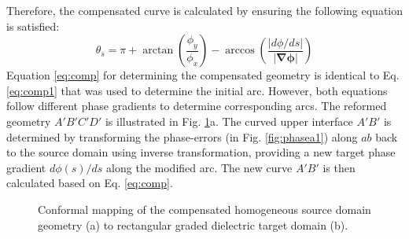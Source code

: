 Therefore, the compensated curve is calculated by ensuring the following equation is satisfied:
%
\begin{equation} \label{eq:comp}
\theta_s =  \pi + \arctan \left( \dfrac{\phi_y}{\phi_x} \right) - \arccos\left( \dfrac{|d\phi/ds|}{|\mathbf{\nabla\phi|}}\right)
\end{equation}
%
Equation \ref{eq:comp} for determining the compensated geometry is identical to Eq.\ref{eq:comp1} that was used to determine the initial arc. However, both equations follow different phase gradients to determine corresponding arcs. The reformed geometry $A'B'C'D'$ is illustrated in Fig. \ref{fig:compensation}a. The curved upper interface $A'B'$ is determined by transforming the phase-errors (in Fig. \ref{fig:phasea1}) along $ab$ back to the source domain using inverse transformation, providing a new target phase gradient $d\phi(s)/ds$ along the modified arc. The new curve $A'B'$ is then calculated based on Eq. \ref{eq:comp}.
\begin{figure} []
\centering
  \noindent
\hspace*{\fill}%
	\noindent
	\mbox{}
\hspace*{\fill}%
  \mbox{}
	  \hspace*{\fill}%
  \caption[Conformal mapping of the compensated homogeneous source domain geometry to rectangular graded dielectric target domain.]{Conformal mapping of the compensated homogeneous source domain geometry (a) to rectangular graded dielectric target domain (b).}
\label{fig:compensation}
\end{figure}
